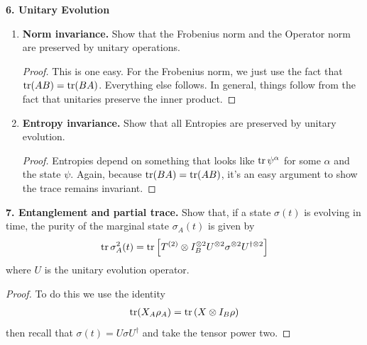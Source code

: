 \documentclass{book}
\theoremstyle{definition}
\newcommand{\al}{\alpha}
\newcommand{\lp}{\left(}
\newcommand{\rp}{\right)}
\newcommand{\lb}{\left[}
\newcommand{\rb}{\right]}
\begin{document}
\begin{enumerate}
\end{enumerate}






\noindent \textbf{6. Unitary Evolution}
\begin{enumerate}
	\item \textbf{Norm invariance.} Show that the Frobenius norm and the Operator norm are preserved by unitary operations.
	\begin{proof}
		This is one easy. For the Frobenius norm, we just use the fact that $\tr(AB) = \tr(BA)$. Everything else follows. In general, things follow from the fact that unitaries preserve the inner product.  
	\end{proof}
	
	\item \textbf{Entropy invariance.} Show that all Entropies are preserved by unitary evolution.
	\begin{proof}
		Entropies depend on something that looks like $\tr \psi^\al$ for some $\al$ and the state $\psi$. Again, because $\tr(BA) = \tr(AB)$, it's an easy argument to show the trace remains invariant.
	\end{proof}

\end{enumerate}



\noindent \textbf{7. Entanglement and partial trace.} Show that, if a state $\sigma(t)$ is evolving in time, the purity of the marginal state $\sigma_A(t)$ is given by 
\begin{align}
\tr \sigma^2_A(t) = \tr \lb T^{(2)} \otimes I_B^{\otimes 2} U^{\otimes 2} \sigma^{\otimes 2} U^{\dagger \otimes 2} \rb
\end{align}
where $U$ is the unitary evolution operator.
\begin{proof}
	To do this we use the identity 
	\begin{align}
	\tr(X_A \rho_A) = \tr\lp X \otimes I_B\rho  \rp
	\end{align}
	then recall that $\sigma(t) = U \sigma U^\dagger$ and take the tensor power two.
\end{proof}
\end{document}
